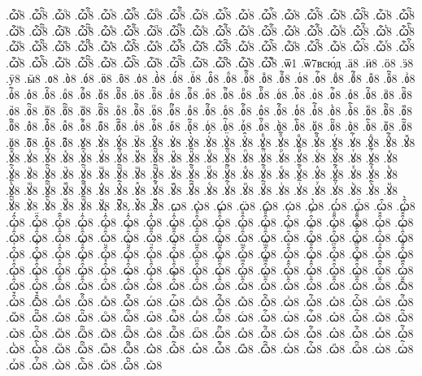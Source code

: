 {.ѽⷩ8
.ѽⷩ҇8
.ѽⷪ8
.ѽⷪ҇8
.ѽⷫ8
.ѽⷫ҇8
.ѽⷬ8
.ѽⷬ҇8
.ѽⷭ8
.ѽⷭ҇8
.ѽⷮ8
.ѽⷮ҇8
.ѽⷯ8
.ѽⷯ҇8
.ѽⷰ8
.ѽⷰ҇8
.ѽⷱ8
.ѽⷱ҇8
.ѽⷲ8
.ѽⷲ҇8
.ѽⷳ8
.ѽⷳ҇8
.ѽⷴ8
.ѽⷴ҇8
.ѽⷵ8
.ѽⷵ҇8
.ѽⷶ8
.ѽⷶ҇8
.ѽⷷ8
.ѽⷷ҇8
.ѽⷸ8
.ѽⷸ҇8
.ѽⷹ8
.ѽⷹ҇8
.ѽⷺ8
.ѽⷺ҇8
.ѽⷻ8
.ѽⷻ҇8
.ѽⷼ8
.ѽⷼ҇8
.ѽⷽ8
.ѽⷽ҇8
.ѽⷾ8
.ѽⷾ҇8
.ѽⷿ8
.ѽⷿ҇8
.ѽꙴ8
.ѽꙴ҇8
.ѽꙵ8
.ѽꙵ҇8
.ѽꙶ8
.ѽꙶ҇8
.ѽꙷ8
.ѽꙷ҇8
.ѽꙸ8
.ѽꙸ҇8
.ѽꙹ8
.ѽꙹ҇8
.ѽꙺ8
.ѽꙺ҇8
.ѽꙻ8
.ѽꙻ҇8
.ѽ꙼8
.ѽ꙼҇8
.ѽ꙽8
.ѽ꙽҇8
.ѿ1
.ѿ7всю́д
.ӓ8
.ӥ8
.ӧ8
.ӭ8
.ӱ8
.ӹ8
.ᲂ8
.ᲂ̀8
.ᲂ́8
.ᲂ̈8
.ᲂ̑8
.ᲂ҆8
.ᲂ҆̀8
.ᲂ҆́8
.ᲂ҆̈8
.ᲂ҆̑8
.ᲂⷠ8
.ᲂⷠ҇8
.ᲂⷡ8
.ᲂⷡ҇8
.ᲂⷢ8
.ᲂⷢ҇8
.ᲂⷣ8
.ᲂⷣ҇8
.ᲂⷤ8
.ᲂⷤ҇8
.ᲂⷥ8
.ᲂⷥ҇8
.ᲂⷦ8
.ᲂⷦ҇8
.ᲂⷧ8
.ᲂⷧ҇8
.ᲂⷨ8
.ᲂⷨ҇8
.ᲂⷩ8
.ᲂⷩ҇8
.ᲂⷪ8
.ᲂⷪ҇8
.ᲂⷫ8
.ᲂⷫ҇8
.ᲂⷬ8
.ᲂⷬ҇8
.ᲂⷭ8
.ᲂⷭ҇8
.ᲂⷮ8
.ᲂⷮ҇8
.ᲂⷯ8
.ᲂⷯ҇8
.ᲂⷰ8
.ᲂⷰ҇8
.ᲂⷱ8
.ᲂⷱ҇8
.ᲂⷲ8
.ᲂⷲ҇8
.ᲂⷳ8
.ᲂⷳ҇8
.ᲂⷴ8
.ᲂⷴ҇8
.ᲂⷵ8
.ᲂⷵ҇8
.ᲂⷶ8
.ᲂⷶ҇8
.ᲂⷷ8
.ᲂⷷ҇8
.ᲂⷸ8
.ᲂⷸ҇8
.ᲂⷹ8
.ᲂⷹ҇8
.ᲂⷺ8
.ᲂⷺ҇8
.ᲂⷻ8
.ᲂⷻ҇8
.ᲂⷼ8
.ᲂⷼ҇8
.ᲂⷽ8
.ᲂⷽ҇8
.ᲂⷾ8
.ᲂⷾ҇8
.ᲂⷿ8
.ᲂⷿ҇8
.ᲂꙴ8
.ᲂꙴ҇8
.ᲂꙵ8
.ᲂꙵ҇8
.ᲂꙶ8
.ᲂꙶ҇8
.ᲂꙷ8
.ᲂꙷ҇8
.ᲂꙸ8
.ᲂꙸ҇8
.ᲂꙹ8
.ᲂꙹ҇8
.ᲂꙺ8
.ᲂꙺ҇8
.ᲂꙻ8
.ᲂꙻ҇8
.ᲂ꙼8
.ᲂ꙼҇8
.ᲂ꙽8
.ᲂ꙽҇8
.ꙋ8
.ꙋ̀8
.ꙋ́8
.ꙋ̈8
.ꙋ̑8
.ꙋ҆8
.ꙋ҆̀8
.ꙋ҆́8
.ꙋ҆̈8
.ꙋ҆̑8
.ꙋⷠ8
.ꙋⷠ҇8
.ꙋⷡ8
.ꙋⷡ҇8
.ꙋⷢ8
.ꙋⷢ҇8
.ꙋⷣ8
.ꙋⷣ҇8
.ꙋⷤ8
.ꙋⷤ҇8
.ꙋⷥ8
.ꙋⷥ҇8
.ꙋⷦ8
.ꙋⷦ҇8
.ꙋⷧ8
.ꙋⷧ҇8
.ꙋⷨ8
.ꙋⷨ҇8
.ꙋⷩ8
.ꙋⷩ҇8
.ꙋⷪ8
.ꙋⷪ҇8
.ꙋⷫ8
.ꙋⷫ҇8
.ꙋⷬ8
.ꙋⷬ҇8
.ꙋⷭ8
.ꙋⷭ҇8
.ꙋⷮ8
.ꙋⷮ҇8
.ꙋⷯ8
.ꙋⷯ҇8
.ꙋⷰ8
.ꙋⷰ҇8
.ꙋⷱ8
.ꙋⷱ҇8
.ꙋⷲ8
.ꙋⷲ҇8
.ꙋⷳ8
.ꙋⷳ҇8
.ꙋⷴ8
.ꙋⷴ҇8
.ꙋⷵ8
.ꙋⷵ҇8
.ꙋⷶ8
.ꙋⷶ҇8
.ꙋⷷ8
.ꙋⷷ҇8
.ꙋⷸ8
.ꙋⷸ҇8
.ꙋⷹ8
.ꙋⷹ҇8
.ꙋⷺ8
.ꙋⷺ҇8
.ꙋⷻ8
.ꙋⷻ҇8
.ꙋⷼ8
.ꙋⷼ҇8
.ꙋⷽ8
.ꙋⷽ҇8
.ꙋⷾ8
.ꙋⷾ҇8
.ꙋⷿ8
.ꙋⷿ҇8
.ꙋꙴ8
.ꙋꙴ҇8
.ꙋꙵ8
.ꙋꙵ҇8
.ꙋꙶ8
.ꙋꙶ҇8
.ꙋꙷ8
.ꙋꙷ҇8
.ꙋꙸ8
.ꙋꙸ҇8
.ꙋꙹ8
.ꙋꙹ҇8
.ꙋꙺ8
.ꙋꙺ҇8
.ꙋꙻ8
.ꙋꙻ҇8
.ꙋ꙼8
.ꙋ꙼҇8
.ꙋ꙽8
.ꙋ꙽҇8
.ꙍ8
.ꙍ̀8
.ꙍ́8
.ꙍ̈8
.ꙍ̑8
.ꙍ҆8
.ꙍ҆̀8
.ꙍ҆́8
.ꙍ҆̈8
.ꙍ҆̑8
.ꙍ҆̑̀8
.ꙍ҆̑́8
.ꙍ҆̑̈8
.ꙍ҆̑̑8
.ꙍ҆̑҆8
.ꙍ҆̑҆̀8
.ꙍ҆̑҆́8
.ꙍ҆̑҆̈8
.ꙍ҆̑҆̑8
.ꙍ҆̑ⷠ8
.ꙍ҆̑ⷠ҇8
.ꙍ҆̑ⷡ8
.ꙍ҆̑ⷡ҇8
.ꙍ҆̑ⷢ8
.ꙍ҆̑ⷢ҇8
.ꙍ҆̑ⷣ8
.ꙍ҆̑ⷣ҇8
.ꙍ҆̑ⷤ8
.ꙍ҆̑ⷤ҇8
.ꙍ҆̑ⷥ8
.ꙍ҆̑ⷥ҇8
.ꙍ҆̑ⷦ8
.ꙍ҆̑ⷦ҇8
.ꙍ҆̑ⷧ8
.ꙍ҆̑ⷧ҇8
.ꙍ҆̑ⷨ8
.ꙍ҆̑ⷨ҇8
.ꙍ҆̑ⷩ8
.ꙍ҆̑ⷩ҇8
.ꙍ҆̑ⷪ8
.ꙍ҆̑ⷪ҇8
.ꙍ҆̑ⷫ8
.ꙍ҆̑ⷫ҇8
.ꙍ҆̑ⷬ8
.ꙍ҆̑ⷬ҇8
.ꙍ҆̑ⷭ8
.ꙍ҆̑ⷭ҇8
.ꙍ҆̑ⷮ8
.ꙍ҆̑ⷮ҇8
.ꙍ҆̑ⷯ8
.ꙍ҆̑ⷯ҇8
.ꙍ҆̑ⷰ8
.ꙍ҆̑ⷰ҇8
.ꙍ҆̑ⷱ8
.ꙍ҆̑ⷱ҇8
.ꙍ҆̑ⷲ8
.ꙍ҆̑ⷲ҇8
.ꙍ҆̑ⷳ8
.ꙍ҆̑ⷳ҇8
.ꙍ҆̑ⷴ8
.ꙍ҆̑ⷴ҇8
.ꙍ҆̑ⷵ8
.ꙍ҆̑ⷵ҇8
.ꙍ҆̑ⷶ8
.ꙍ҆̑ⷶ҇8
.ꙍ҆̑ⷷ8
.ꙍ҆̑ⷷ҇8
.ꙍ҆̑ⷸ8
.ꙍ҆̑ⷸ҇8
.ꙍ҆̑ⷹ8
.ꙍ҆̑ⷹ҇8
.ꙍ҆̑ⷺ8
.ꙍ҆̑ⷺ҇8
.ꙍ҆̑ⷻ8
.ꙍ҆̑ⷻ҇8
.ꙍ҆̑ⷼ8
.ꙍ҆̑ⷼ҇8
.ꙍ҆̑ⷽ8
.ꙍ҆̑ⷽ҇8
.ꙍ҆̑ⷾ8
.ꙍ҆̑ⷾ҇8
.ꙍ҆̑ⷿ8
.ꙍ҆̑ⷿ҇8
.ꙍ҆̑ꙴ8
.ꙍ҆̑ꙴ҇8
.ꙍ҆̑ꙵ8
.ꙍ҆̑ꙵ҇8
.ꙍ҆̑ꙶ8
.ꙍ҆̑ꙶ҇8
.ꙍ҆̑ꙷ8
.ꙍ҆̑ꙷ҇8
.ꙍ҆̑ꙸ8
.ꙍ҆̑ꙸ҇8
.ꙍ҆̑ꙹ8
.ꙍ҆̑ꙹ҇8
.ꙍ҆̑ꙺ8
.ꙍ҆̑ꙺ҇8
.ꙍ҆̑ꙻ8
.ꙍ҆̑ꙻ҇8
.ꙍ҆̑꙼8
.ꙍ҆̑꙼҇8
.ꙍ҆̑꙽8
.ꙍ҆̑꙽҇8
.ꙍⷠ8
.ꙍⷠ҇8
.ꙍⷡ8
.ꙍⷡ҇8
.ꙍⷢ8
.ꙍⷢ҇8
.ꙍⷣ8
.ꙍⷣ҇8
.ꙍⷤ8
.ꙍⷤ҇8
.ꙍⷥ8
.ꙍⷥ҇8
.ꙍⷦ8
.ꙍⷦ҇8
.ꙍⷧ8
.ꙍⷧ҇8
.ꙍⷨ8
.ꙍⷨ҇8
.ꙍⷩ8
.ꙍⷩ҇8
.ꙍⷪ8
.ꙍⷪ҇8
.ꙍⷫ8
.ꙍⷫ҇8
.ꙍⷬ8
.ꙍⷬ҇8
.ꙍⷭ8
.ꙍⷭ҇8
.ꙍⷮ8
.ꙍⷮ҇8
.ꙍⷯ8
.ꙍⷯ҇8
.ꙍⷰ8
.ꙍⷰ҇8
.ꙍⷱ8
.ꙍⷱ҇8
.ꙍⷲ8
.ꙍⷲ҇8
.ꙍⷳ8
.ꙍⷳ҇8
.ꙍⷴ8
.ꙍⷴ҇8
.ꙍⷵ8
.ꙍⷵ҇8
.ꙍⷶ8
.ꙍⷶ҇8
.ꙍⷷ8
.ꙍⷷ҇8
.ꙍⷸ8
.ꙍⷸ҇8
.ꙍⷹ8
.ꙍⷹ҇8
.ꙍⷺ8
.ꙍⷺ҇8
.ꙍⷻ8
.ꙍⷻ҇8
.ꙍⷼ8
.ꙍⷼ҇8
.ꙍⷽ8
.ꙍⷽ҇8
.ꙍⷾ8
.ꙍⷾ҇8
.ꙍⷿ8
.ꙍⷿ҇8
.ꙍꙴ8
.ꙍꙴ҇8
.ꙍꙵ8
.ꙍꙵ҇8
.ꙍꙶ8
.ꙍꙶ҇8
.ꙍꙷ8
.ꙍꙷ҇8
.ꙍꙸ8
.ꙍꙸ҇8
.ꙍꙹ8
.ꙍꙹ҇8
.ꙍꙺ8
}
